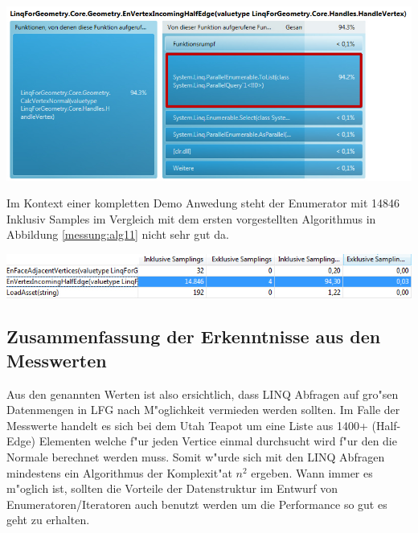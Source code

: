 \documentclass[pagesize, paper=a4, fontsize=12pt,titlepage=true, headings=small, headnosepline, abstractoff, liststotoc, nochapterprefix, plainheadsepline]{scrreprt}
\begin{document}
\begin{minipage}[c][10cm]{\linewidth}
\includegraphics[width=\linewidth]{../Messung/2-linq-envertexinche-2-0}
\label{messung:alg31}
\end{minipage}

Im Kontext einer kompletten Demo Anwedung steht der Enumerator mit 14846 Inklusiv Samples im Vergleich mit dem ersten vorgestellten Algorithmus in Abbildung \ref{messung:alg11} nicht sehr gut da.
\begin{minipage}[c][5cm]{\linewidth}
\includegraphics[width=\linewidth]{../Messung/2-linq-envertexinche-2}
\label{messung:alg32}
\end{minipage}

\subsection{Zusammenfassung der Erkenntnisse aus den Messwerten}
Aus den genannten Werten ist also ersichtlich, dass LINQ Abfragen auf gro"sen Datenmengen in LFG nach M"oglichkeit vermieden werden sollten. Im Falle der Messwerte handelt es sich bei dem Utah Teapot um eine Liste aus 1400+ (Half-Edge) Elementen welche f"ur jeden Vertice einmal durchsucht wird f"ur den die Normale berechnet werden muss. Somit w"urde sich mit den LINQ Abfragen mindestens ein Algorithmus der Komplexit"at $n^2$ ergeben. Wann immer es m"oglich ist, sollten die Vorteile der Datenstruktur im Entwurf von Enumeratoren/Iteratoren auch benutzt werden um die Performance so gut es geht zu erhalten.
\newpage
\end{document}

